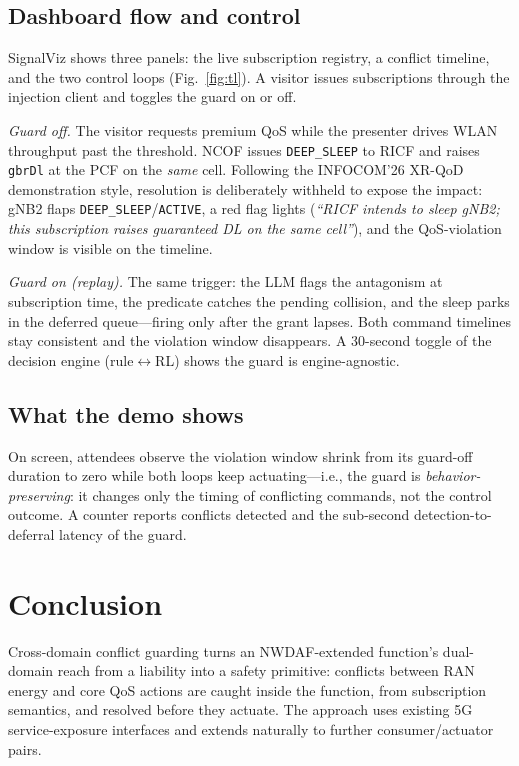 \documentclass[conference]{IEEEtran}
\begin{document}
\subsection{Dashboard flow and control}
SignalViz shows three panels: the live subscription registry, a conflict
timeline, and the two control loops (Fig.~\ref{fig:tl}). A visitor issues
subscriptions through the injection client and toggles the guard on or off.

\emph{Guard off.} The visitor requests premium QoS while the presenter drives
WLAN throughput past the threshold. NCOF issues \texttt{DEEP\_SLEEP} to RICF and
raises \texttt{gbrDl} at the PCF on the \emph{same} cell. Following the
INFOCOM'26 XR-QoD demonstration style, resolution is deliberately withheld to
expose the impact: gNB2 flaps \texttt{DEEP\_SLEEP}/\texttt{ACTIVE}, a red flag
lights (\emph{``RICF intends to sleep gNB2; this subscription raises guaranteed
DL on the same cell''}), and the QoS-violation window is visible on the
timeline.

\emph{Guard on (replay).} The same trigger: the LLM flags the antagonism at
subscription time, the predicate catches the pending collision, and the sleep
parks in the deferred queue---firing only after the grant lapses. Both command
timelines stay consistent and the violation window disappears. A 30-second
toggle of the decision engine (rule$\leftrightarrow$RL) shows the guard is
engine-agnostic.

\subsection{What the demo shows}
On screen, attendees observe the violation window shrink from its
guard-off duration to zero while both loops keep actuating---i.e., the
guard is \emph{behavior-preserving}: it changes only the timing of
conflicting commands, not the control outcome. A counter reports conflicts
detected and the sub-second detection-to-deferral latency of the guard.

\section{Conclusion}
Cross-domain conflict guarding turns an NWDAF-extended function's dual-domain
reach from a liability into a safety primitive: conflicts between RAN energy
and core QoS actions are caught inside the function, from subscription
semantics, and resolved before they actuate. The approach uses existing 5G
service-exposure interfaces and extends naturally to further consumer/actuator
pairs.
\end{document}
